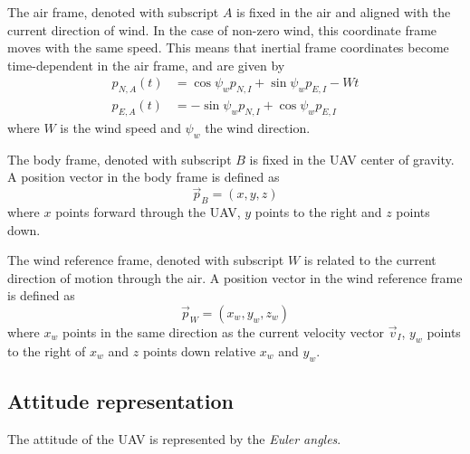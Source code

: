 \begin{definition}
    The air frame, denoted with subscript $A$ is fixed in the air and aligned with the current direction of wind. In the case of non-zero wind,
    this coordinate frame moves with the same speed.
    This means that inertial frame coordinates become time-dependent in the air frame, and are given by
    \begin{align}
        p_{N,A}(t) &= \cos\psi_w p_{N,I} + \sin\psi_w p_{E,I} - Wt\\
        p_{E,A}(t) &= -\sin\psi_w p_{N,I} + \cos\psi_w p_{E,I}
    \end{align}
    where $W$ is the wind speed and $\psi_w$ the wind direction.
\end{definition}

\begin{definition}
    The body frame, denoted with subscript $B$ is fixed in the UAV center of gravity.
    A position vector in the body frame is defined as
    \begin{equation}
        \vec{p}_B = (x, y, z)
    \end{equation}
    where $x$ points forward through the UAV, $y$ points to the right and $z$ points down.
\end{definition}

\begin{definition}
    The wind reference frame, denoted with subscript $W$ is related to the current direction of motion
    through the air.
    A position vector in the wind reference frame is defined as
    \begin{equation}
        \vec{p}_W = (x_w, y_w, z_w)
    \end{equation}
    where $x_w$ points in the same direction as the current velocity vector $\vec{v}_I$, 
    $y_w$ points to the right of $x_w$ and $z$ points down relative $x_w$ and $y_w$.
\end{definition}

\subsection{Attitude representation}
The attitude of the UAV is represented by the \textit{Euler angles}. 

